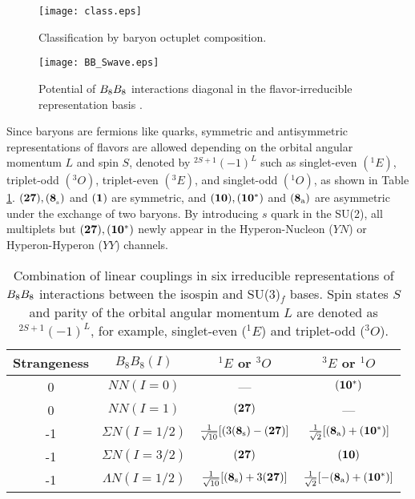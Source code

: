 \begin{figure}[h]
 \begin{center}
   \texttt{[image: class.eps]}
   \caption{Classification by baryon octuplet composition.}
   \label{fig-class}
 \end{center}
\end{figure}

\begin{figure}[h]
 \begin{center}
   \texttt{[image: BB\_Swave.eps]}
   \caption{Potential of $B_{8}B_{8}$ interactions diagonal in the flavor-irreducible representation basis \cite{QCD-2019}.}
   \label{fig-BB_Swave}
 \end{center}
\end{figure}

Since baryons are fermions like quarks, symmetric and antisymmetric representations of flavors are allowed depending on the orbital angular momentum $L$ and spin $S$, denoted by $^{2S+1}(-1)^{L}$ such as singlet-even $(^1E)$, triplet-odd $(^3O)$, triplet-even $(^3E)$, and singlet-odd $(^1O)$, as shown in Table \ref{table-BBint}. %
${\bf (27), (8_{\rm_{s}})}$ and ${\bf (1)}$ are symmetric, and ${\bf (10), (10^*)}$ and ${\bf (8_{\rm{a}})}$ are asymmetric under the exchange of two baryons. By introducing $s$ quark in the SU(2), all multiplets but ${\bf (27), (10^*)}$ newly appear in the Hyperon-Nucleon ($YN$) or Hyperon-Hyperon ($YY$) channels. 

\begin{table}[h]
  \begin{center}
    \caption{Combination of linear couplings in six irreducible representations of $B_{8}B_{8}$ interactions between the isospin and SU(3)$_f$ bases. Spin states $S$ and parity of the orbital angular momentum $L$ are denoted as ${}^{2S+1}(-1)^{L}$, for example, singlet-even (${}^{1}E$) and triplet-odd (${}^{3}O$).}
    \begin{tabular}{cccc} \hline \hline
      Strangeness & $B_{8}B_{8}(I)$ & $^1E$ or $^3O$ & $^3E$ or $^1O$ \\ \hline
      0 & $NN (I=0)$ & --- & ${\bf (10^*)}$ \\
      0 & $NN (I=1)$ & ${\bf (27)}$ & --- \\ \hline
      -1 & $\Sigma N (I=1/2)$ & $\frac{1}{\sqrt{10}}[(3({\bf 8_{\rm{s}}})-{\bf (27)}]$ & $\frac{1}{\sqrt{2}}[({\bf 8_{\rm{a}}})+{\bf (10^*)}]$ \\
      -1 & $\Sigma N (I=3/2)$ & ${\bf (27)}$ & ${\bf (10)}$ \\ \hline
      -1 & $\Lambda N (I=1/2)$ & $\frac{1}{\sqrt{10}}[({\bf 8_{\rm{s}}})+3{\bf (27)}]$ & $\frac{1}{\sqrt{2}}[-({\bf 8_{\rm{a}}})+{\bf (10^*)}]$ \\ \hline\hline
   \end{tabular}
   \label{table-BBint}
   \end{center}
\end{table}

